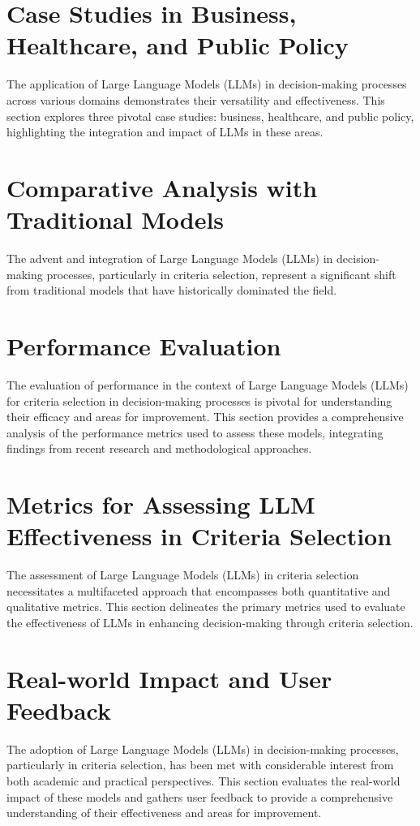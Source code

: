 \documentclass{article}
\begin{document}
\section{Case Studies in Business, Healthcare, and Public Policy}
The application of Large Language Models (LLMs) in decision-making processes across various domains demonstrates their versatility and effectiveness. This section explores three pivotal case studies: business, healthcare, and public policy, highlighting the integration and impact of LLMs in these areas.

\section{Comparative Analysis with Traditional Models}
The advent and integration of Large Language Models (LLMs) in decision-making processes, particularly in criteria selection, represent a significant shift from traditional models that have historically dominated the field.

\section{Performance Evaluation}
The evaluation of performance in the context of Large Language Models (LLMs) for criteria selection in decision-making processes is pivotal for understanding their efficacy and areas for improvement. This section provides a comprehensive analysis of the performance metrics used to assess these models, integrating findings from recent research and methodological approaches.

\section{Metrics for Assessing LLM Effectiveness in Criteria Selection}
The assessment of Large Language Models (LLMs) in criteria selection necessitates a multifaceted approach that encompasses both quantitative and qualitative metrics. This section delineates the primary metrics used to evaluate the effectiveness of LLMs in enhancing decision-making through criteria selection.

\section{Real-world Impact and User Feedback}
The adoption of Large Language Models (LLMs) in decision-making processes, particularly in criteria selection, has been met with considerable interest from both academic and practical perspectives. This section evaluates the real-world impact of these models and gathers user feedback to provide a comprehensive understanding of their effectiveness and areas for improvement.
\end{document}
